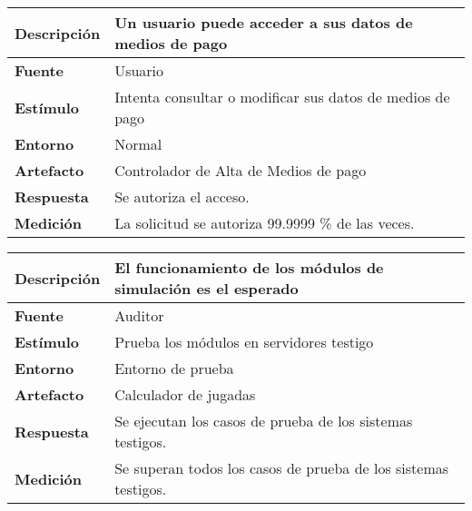 \begin{center}
  \begin{tabular}{| l | p{10cm} | }
    \hline
	\textbf{Descripción} & Un usuario puede acceder a sus datos de medios de pago\\  \hline
	\textbf{Fuente} & Usuario\\  \hline
	\textbf{Estímulo} & Intenta consultar o modificar sus datos de medios de pago\\  \hline
	\textbf{Entorno} & Normal\\  \hline
	\textbf{Artefacto} & Controlador de Alta de Medios de pago\\  \hline
	\textbf{Respuesta} & Se autoriza el acceso.\\  \hline
	\textbf{Medición} & La solicitud se autoriza 99.9999 \% de las veces.\\  \hline
  \end{tabular}
\end{center} 




\begin{center}
  \begin{tabular}{| l | p{10cm} | }
    \hline
	\textbf{Descripción} & El funcionamiento de los módulos de simulación es el esperado\\  \hline
	\textbf{Fuente} & Auditor\\  \hline
	\textbf{Estímulo} & Prueba los módulos en servidores testigo\\  \hline
	\textbf{Entorno} & Entorno de prueba\\  \hline
	\textbf{Artefacto} & Calculador de jugadas\\  \hline
	\textbf{Respuesta} & Se ejecutan los casos de prueba de los sistemas testigos.\\  \hline
	\textbf{Medición} & Se superan todos los casos de prueba de los sistemas testigos.\\  \hline
  \end{tabular}
\end{center}

